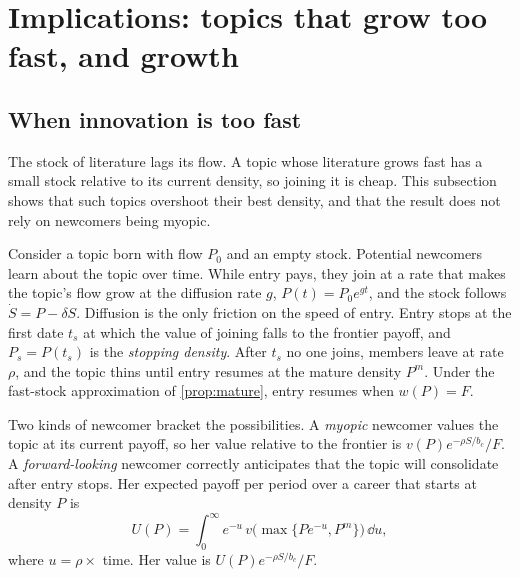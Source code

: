 \section{Implications: topics that grow too fast, and growth}\label{sec:macro}

\subsection{When innovation is too fast}

The stock of literature lags its flow. A topic whose literature grows fast has a
small stock relative to its current density, so joining it is cheap. This
subsection shows that such topics overshoot their best density, and that the
result does not rely on newcomers being myopic.

Consider a topic born with flow $P_0$ and an empty stock. Potential newcomers
learn about the topic over time. While entry pays, they join at a rate that
makes the topic's flow grow at the diffusion rate $g$, $P(t)=P_0e^{gt}$, and the
stock follows $\dot S=P-\delta S$. Diffusion is the only friction on the speed of
entry. Entry stops at the first date $t_s$ at which the value of joining falls to
the frontier payoff, and $P_s=P(t_s)$ is the \emph{stopping density}. After
$t_s$ no one joins, members leave at rate $\rho$, and the topic thins until entry
resumes at the mature density $P^m$. Under the fast-stock approximation of
\cref{prop:mature}, entry resumes when $w(P)=F$.

Two kinds of newcomer bracket the possibilities. A \emph{myopic} newcomer values
the topic at its current payoff, so her value relative to the frontier is
$v(P)e^{-\rho S/b_c}/F$. A \emph{forward-looking} newcomer correctly anticipates
that the topic will consolidate after entry stops. Her expected payoff per period
over a career that starts at density $P$ is
\[
U(P)=\int_0^\infty e^{-u}\,v\big(\max\{Pe^{-u},P^m\}\big)\,\dd u,
\]
where $u=\rho\times$ time. Her value is $U(P)e^{-\rho S/b_c}/F$.

